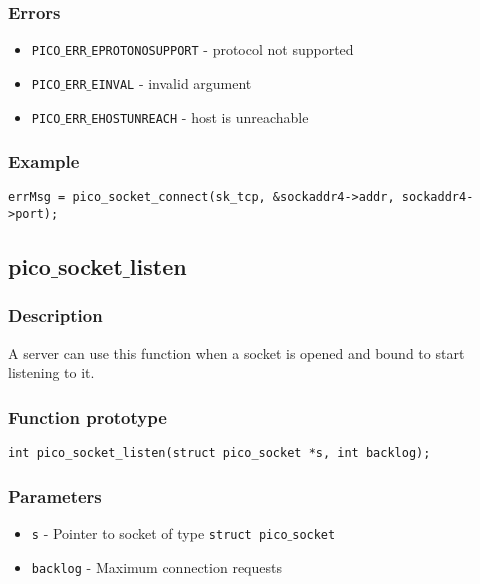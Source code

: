 \subsubsection*{Errors}
\begin{itemize}[noitemsep]
\item \texttt{PICO$\_$ERR$\_$EPROTONOSUPPORT} - protocol not supported
\item \texttt{PICO$\_$ERR$\_$EINVAL} - invalid argument
\item \texttt{PICO$\_$ERR$\_$EHOSTUNREACH} - host is unreachable 
\end{itemize}

\subsubsection*{Example}
\begin{verbatim}
errMsg = pico_socket_connect(sk_tcp, &sockaddr4->addr, sockaddr4->port);
\end{verbatim}


\subsection{pico$\_$socket$\_$listen}

\subsubsection*{Description}
A server can use this function when a socket is opened and bound to start listening to it.

\subsubsection*{Function prototype}
\begin{verbatim}
int pico_socket_listen(struct pico_socket *s, int backlog);
\end{verbatim}


\subsubsection*{Parameters}
\begin{itemize}[noitemsep]
\item \texttt{s} - Pointer to socket of type \texttt{struct pico$\_$socket}
\item \texttt{backlog} - Maximum connection requests
\end{itemize}

